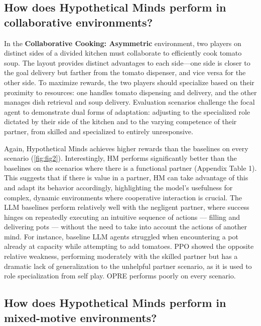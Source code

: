 \documentclass{article} %
\begin{document}
\vspace{-6pt}
\subsection{How does Hypothetical Minds perform in collaborative environments?}

In the \textbf{Collaborative Cooking: Asymmetric} environment, two players on distinct sides of a divided kitchen must collaborate to efficiently cook tomato soup. The layout provides distinct advantages to each side—one side is closer to the goal delivery but farther from the tomato dispenser, and vice versa for the other side.  To maximize rewards, the two players should specialize based on their proximity to resources: one handles tomato dispensing and delivery, and the other manages dish retrieval and soup delivery. Evaluation scenarios challenge the focal agent to demonstrate dual forms of adaptation: adjusting to the specialized role dictated by their side of the kitchen and to the varying competence of their partner, from skilled and specialized to entirely unresponsive.

Again, Hypothetical Minds achieves higher rewards than the baselines on every scenario (\autoref{fig:fig2}). Interestingly, HM performs significantly better than the baselines on the scenarios where there is a functional partner (Appendix Table 1). This suggests that if there is value in a partner, HM can take advantage of this and adapt its behavior accordingly, highlighting the model's usefulness for complex, dynamic environments where  cooperative interaction is crucial. The LLM baselines perform relatively well with the negligent partner, where success hinges on repeatedly executing an intuitive sequence of actions — filling and delivering pots — without the need to take into account the actions of another mind. For instance, baseline LLM agents struggled when encountering a pot already at capacity while attempting to add tomatoes. PPO showed the opposite relative weakness, performing moderately with the skilled partner but has a dramatic lack of generalization to the unhelpful partner scenario, as it is used to role specialization from self play. OPRE performs poorly on every scenario.

\vspace{-6pt}
\subsection{How does Hypothetical Minds perform in mixed-motive environments?}
\end{document}
